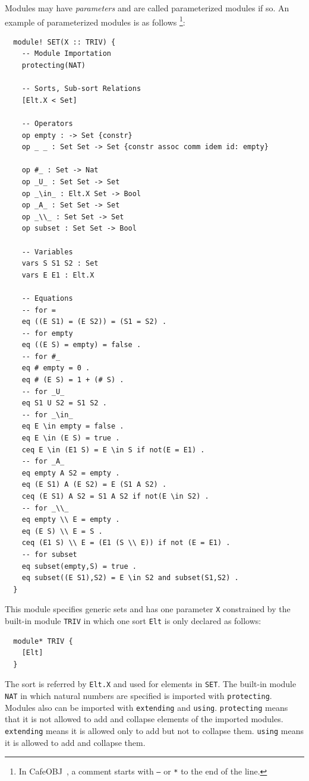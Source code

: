 \documentclass[12pt]{report}
\newcommand{\cafeobj}{{\sf CafeOBJ}~}
\begin{document}
Modules may have {\it parameters} and are called parameterized modules
if so. An example of parameterized modules is as follows
\footnote{In \cafeobj, a comment starts with {\tt --} or {\tt **} to
  the end of the line.}:
\begin{verbatim}
  module! SET(X :: TRIV) {
    -- Module Importation
    protecting(NAT)
  
    -- Sorts, Sub-sort Relations
    [Elt.X < Set]
  
    -- Operators
    op empty : -> Set {constr}
    op _ _ : Set Set -> Set {constr assoc comm idem id: empty}
  
    op #_ : Set -> Nat
    op _U_ : Set Set -> Set
    op _\in_ : Elt.X Set -> Bool
    op _A_ : Set Set -> Set
    op _\\_ : Set Set -> Set
    op subset : Set Set -> Bool
  
    -- Variables
    vars S S1 S2 : Set
    vars E E1 : Elt.X
  
    -- Equations
    -- for =
    eq ((E S1) = (E S2)) = (S1 = S2) .
    -- for empty
    eq ((E S) = empty) = false .
    -- for #_
    eq # empty = 0 .   
    eq # (E S) = 1 + (# S) . 
    -- for _U_
    eq S1 U S2 = S1 S2 .
    -- for _\in_
    eq E \in empty = false .
    eq E \in (E S) = true .
    ceq E \in (E1 S) = E \in S if not(E = E1) .
    -- for _A_
    eq empty A S2 = empty .
    eq (E S1) A (E S2) = E (S1 A S2) .
    ceq (E S1) A S2 = S1 A S2 if not(E \in S2) .
    -- for _\\_ 
    eq empty \\ E = empty .
    eq (E S) \\ E = S .
    ceq (E1 S) \\ E = (E1 (S \\ E)) if not (E = E1) .
    -- for subset
    eq subset(empty,S) = true .
    eq subset((E S1),S2) = E \in S2 and subset(S1,S2) .
  }
\end{verbatim}
This module specifies generic sets and has one parameter {\tt X}
constrained by the built-in module {\tt TRIV} in which one sort
{\tt Elt} is only declared as follows:
\begin{verbatim}
  module* TRIV {
    [Elt]
  }
\end{verbatim}
The sort is referred by {\tt Elt.X} and used for elements in
{\tt SET}. The built-in module {\tt NAT} in which natural numbers are
specified is imported with {\tt protecting}. Modules also can be
imported with {\tt extending} and {\tt using}. {\tt protecting} means
that it is not allowed to add and collapse elements of the imported
modules.  {\tt extending} means it is allowed only to add but not to
collapse them. {\tt using} means it is allowed to add and collapse
them.
\end{document}
